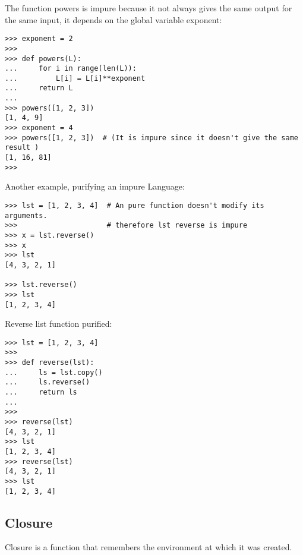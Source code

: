 \documentclass[11pt]{article}
\begin{document}
The function powers is impure because it not always gives the same output
for the same input, it depends on the global variable exponent:

\begin{verbatim}
>>> exponent = 2
>>> 
>>> def powers(L):
...     for i in range(len(L)):
...         L[i] = L[i]**exponent
...     return L
... 
>>> powers([1, 2, 3])
[1, 4, 9]
>>> exponent = 4 
>>> powers([1, 2, 3])  # (It is impure since it doesn't give the same result )
[1, 16, 81]
>>>
\end{verbatim}

Another example, purifying an impure Language:

\begin{verbatim}
>>> lst = [1, 2, 3, 4]  # An pure function doesn't modify its arguments.
>>>                     # therefore lst reverse is impure
>>> x = lst.reverse()
>>> x
>>> lst
[4, 3, 2, 1]

>>> lst.reverse()
>>> lst
[1, 2, 3, 4]
\end{verbatim}

Reverse list function purified:

\begin{verbatim}
>>> lst = [1, 2, 3, 4]
>>>
>>> def reverse(lst):
...     ls = lst.copy()
...     ls.reverse()
...     return ls
... 
>>> 
>>> reverse(lst)
[4, 3, 2, 1]
>>> lst
[1, 2, 3, 4]
>>> reverse(lst)
[4, 3, 2, 1]
>>> lst
[1, 2, 3, 4]
\end{verbatim}

\subsection{Closure}
\label{sec-1-5}

Closure is a function that remembers the environment at which it was created.
\end{document}
